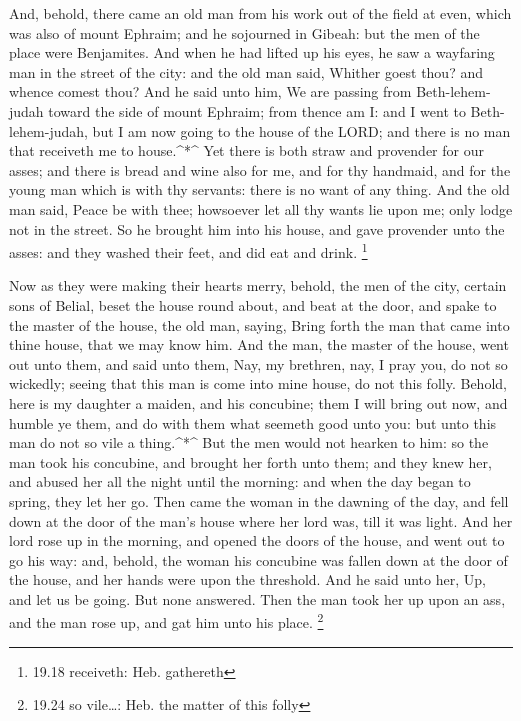  And, behold, there came an old man from his work out of
the field at even, which was also of mount Ephraim; and he sojourned in
Gibeah: but the men of the place were Benjamites.  And when
he had lifted up his eyes, he saw a wayfaring man in the street of the
city: and the old man said, Whither goest thou? and whence comest thou?
 And he said unto him, We are passing from Beth-lehem-judah
toward the side of mount Ephraim; from thence am I: and I went to
Beth-lehem-judah, but I am now going to the house of the LORD; and there
is no man that receiveth me to house.\^{}*\^{}  Yet there
is both straw and provender for our asses; and there is bread and wine
also for me, and for thy handmaid, and for the young man which is with
thy servants: there is no want of any thing.  And the old
man said, Peace be with thee; howsoever let all thy wants lie upon me;
only lodge not in the street.  So he brought him into his
house, and gave provender unto the asses: and they washed their feet,
and did eat and drink. \footnote{19.18 receiveth: Heb. gathereth}

 Now as they were making their hearts merry, behold, the
men of the city, certain sons of Belial, beset the house round about,
and beat at the door, and spake to the master of the house, the old man,
saying, Bring forth the man that came into thine house, that we may know
him.  And the man, the master of the house, went out unto
them, and said unto them, Nay, my brethren, nay, I pray you, do not so
wickedly; seeing that this man is come into mine house, do not this
folly.  Behold, here is my daughter a maiden, and his
concubine; them I will bring out now, and humble ye them, and do with
them what seemeth good unto you: but unto this man do not so vile a
thing.\^{}*\^{}  But the men would not hearken to him: so
the man took his concubine, and brought her forth unto them; and they
knew her, and abused her all the night until the morning: and when the
day began to spring, they let her go.  Then came the woman
in the dawning of the day, and fell down at the door of the man's house
where her lord was, till it was light.  And her lord rose
up in the morning, and opened the doors of the house, and went out to go
his way: and, behold, the woman his concubine was fallen down at the
door of the house, and her hands were upon the threshold. 
And he said unto her, Up, and let us be going. But none answered. Then
the man took her up upon an ass, and the man rose up, and gat him unto
his place. \footnote{19.24 so vile\ldots: Heb. the matter of this folly}

